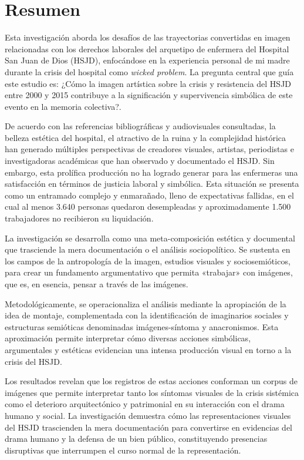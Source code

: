 \section*{Resumen}
\setlength{\parskip}{1em}

Esta investigación aborda los desafíos de las trayectorias convertidas en imagen relacionadas con los derechos laborales del arquetipo de enfermera del Hospital San Juan de Dios (HSJD), enfocándose en la experiencia personal de mi madre durante la crisis del hospital como \textit{wicked problem}. La pregunta central que guía este estudio es: ¿Cómo la imagen artística sobre la crisis y resistencia del HSJD entre 2000 y 2015 contribuye a la significación y supervivencia simbólica de este evento en la memoria colectiva?.

De acuerdo con las referencias bibliográficas y audiovisuales consultadas, la belleza estética del hospital, el atractivo de la ruina y la complejidad histórica han generado múltiples perspectivas de creadores visuales, artistas, periodistas e investigadoras académicas que han observado y documentado el HSJD. Sin embargo, esta prolífica producción no ha logrado generar para las enfermeras una satisfacción en términos de justicia laboral y simbólica. Esta situación se presenta como un entramado complejo y enmarañado, lleno de expectativas fallidas, en el cual al menos 3.640 personas quedaron desempleadas y aproximadamente 1.500 trabajadores no recibieron su liquidación.

La investigación se desarrolla como una meta-composición estética y documental que trasciende la mera documentación o el análisis sociopolítico. Se sustenta en los campos de la antropología de la imagen, estudios visuales y sociosemióticos, para crear un fundamento argumentativo que permita «trabajar» con imágenes, que es, en esencia, pensar a través de las imágenes.

Metodológicamente, se operacionaliza el análisis mediante la apropiación de la idea de montaje, complementada con la identificación de imaginarios sociales y estructuras semióticas denominadas imágenes-síntoma y anacronismos. Esta aproximación permite interpretar cómo diversas acciones simbólicas, argumentales y estéticas evidencian una intensa producción visual en torno a la crisis del HSJD.

Los resultados revelan que los registros de estas acciones conforman un corpus de imágenes que permite interpretar tanto los síntomas visuales de la crisis sistémica como el deterioro arquitectónico y patrimonial en su interacción con el drama humano y social. La investigación demuestra cómo las representaciones visuales del HSJD trascienden la mera documentación para convertirse en evidencias del drama humano y la defensa de un bien público, constituyendo presencias disruptivas que interrumpen el curso normal de la representación.

